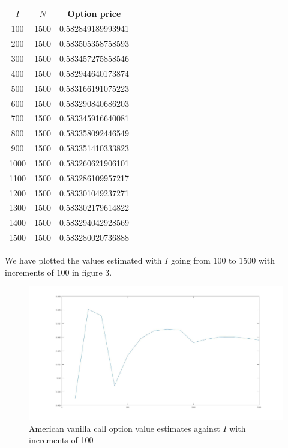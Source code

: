 \begin{center}
	\begin{tabular}{| c | c | c |}
		\hline $I$ & $N$ & Option price\\
		[0.5ex]
		\hline 100 & 1500 & 0.582849189993941 \\
		\hline 200 & 1500 & 0.583505358758593 \\
		\hline 300 & 1500 & 0.583457275858546 \\
		\hline 400 & 1500 & 0.582944640173874 \\
		\hline 500 & 1500 & 0.583166191075223 \\
		\hline 600 & 1500 & 0.583290840686203 \\
		\hline 700 & 1500 & 0.583345916640081 \\
		\hline 800 & 1500 & 0.583358092446549 \\
		\hline 900 & 1500 & 0.583351410333823 \\
		\hline 1000 & 1500 &0.583260621906101 \\
		\hline 1100 & 1500 &0.583286109957217 \\
		\hline 1200 & 1500 &0.583301049237271 \\
		\hline 1300 & 1500 &0.583302179614822 \\
		\hline 1400 & 1500 &0.583294042928569 \\
		\hline 1500 & 1500 &0.583280020736888 \\
		\hline
	\end{tabular}
\end{center}

We have plotted the values estimated with $I$ going from $100$ to $1500$ with increments of $100$ in figure 3.

\begin{figure}[htbp!]
	\centering
	\includegraphics[scale=0.2]{smallPlot2.jpg}
	\caption{American vanilla call option value estimates against $I$ with increments of 100}
\end{figure}

